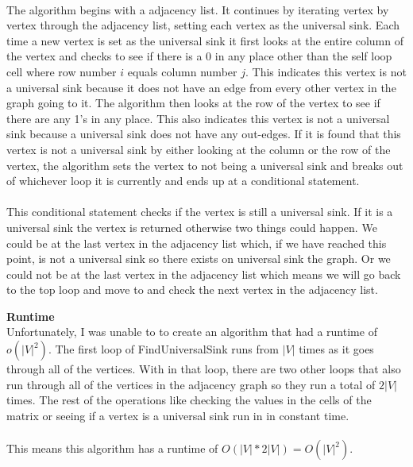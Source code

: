 \documentclass[12pt]{article}
\begin{document}
\begin{enumerate}
	\\
	The algorithm begins with a adjacency list.  It continues by iterating vertex by vertex through the adjacency list, setting each vertex as the universal sink.  
	Each time a new vertex is set as the universal sink it first looks at the entire column of the vertex and checks to see if there is a 0 in any place other than the self loop cell where row number $i$ equals column number $j$.     
	This indicates this vertex is not a universal sink because it does not have an edge from every other vertex in the graph going to it.
	The algorithm then looks at the row of the vertex to see if there are any 1's in any place.  This also indicates this vertex is not a universal sink because a universal sink does not have any out-edges.
	If it is found that this vertex is not a universal sink by either looking at the column or the row of the vertex, the algorithm sets the vertex to not being a universal sink and breaks out of whichever loop it is currently and 
	ends up at a conditional statement.\\
	\\
	This conditional statement checks if the vertex is still a universal sink.  If it is a universal sink the vertex is returned otherwise two things could happen.  
	We could be at the last vertex in the adjacency list which, if we have reached this point, is not a universal sink so there exists on universal sink the graph.
	Or we could not be at the last vertex in the adjacency list which means we will go back to the top loop and move to and check the next vertex in the adjacency list.
	
	\textbf{Runtime}\\
	Unfortunately, I was unable to to create an algorithm that had a runtime of $o(|V|^2)$.
	The first loop of FindUniversalSink runs from $|V|$ times as it goes through all of the vertices.  
	With in that loop, there are two other loops that also run through all of the vertices in the adjacency graph so they run a total of $2|V|$ times.
	The rest of the operations like checking the values in the cells of the matrix or seeing if a vertex is a universal sink run in in constant time.\\
	\\
	This means this algorithm has a runtime of $O(|V|*2|V|) = O(|V|^2)$.  
	

\end{enumerate}
\end{document}
